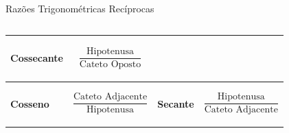 \documentclass[aspectratio=169, t, 8pt]{beamer}
\begin{document}
\begin{frame}{Razões Trigonométricas Recíprocas}
\begin{columns}[c, totalwidth=.8\textwidth]
\begin{column}{\textwidth}
\begin{tabular}{m{} | m{} | m{} | m{}}
                    {
                        \begin{center}
                            \textbf{Cossecante}
                        \end{center}
                    } &
                    {
                        \begin{center}
                            $$
                            \frac{
                                \text{Hipotenusa}
                            }{
                                \text{Cateto Oposto}
                            }
                            $$
                        \end{center}
                    }\\

                    \hline

                    {
                        \begin{center}
                            \textbf{Cosseno}
                        \end{center}
                    } &
                    {
                        \begin{center}
                            $$
                            \frac{
                                \text{Cateto Adjacente}
                            }{
                                \text{Hipotenusa}
                            }
                            $$
                        \end{center}
                    } &

                    {
                        \begin{center}
                            \textbf{Secante}
                        \end{center}
                    } &
                    {
                        \begin{center}
                            $$
                            \frac{
                                \text{Hipotenusa}
                            }{
                                \text{Cateto Adjacente}
                            }
                            $$
                        \end{center}
                    }\\

                    \hline


\end{tabular}
\end{column}
\end{columns}
\end{frame}
\end{document}
